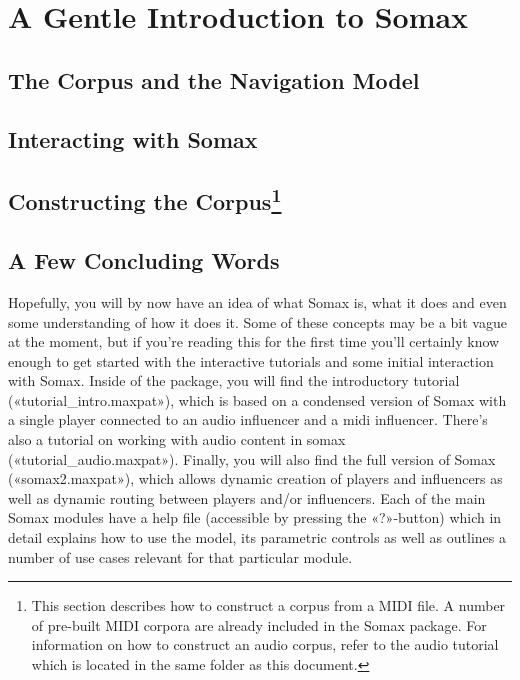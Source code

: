 \documentclass[11pt,a4paper]{report}
\begin{document}
\thispagestyle{empty}


\section*{A Gentle Introduction to Somax}




\subsection*{The Corpus and the Navigation Model}


\subsection*{Interacting with Somax}


\subsection*{Constructing the Corpus\footnote{This section describes how to construct a corpus from a MIDI file. A number of pre-built MIDI corpora are already included in the Somax package. For information on how to construct an audio corpus, refer to the audio tutorial which is located in the same folder as this document.}}



\subsection*{A Few Concluding Words}
Hopefully, you will by now have an idea of what Somax is, what it does and even some understanding of how it does it. Some of these concepts may be a bit vague at the moment, but if you're reading this for the first time you'll certainly know enough to get started with the interactive tutorials and some initial interaction with Somax. Inside of the package, you will find the introductory tutorial («tutorial\_intro.maxpat»), which is based on a condensed version of Somax with a single player connected to an audio influencer and a midi influencer. There's also a tutorial on working with audio content in somax («tutorial\_audio.maxpat»). Finally, you will also find the full version of Somax («somax2.maxpat»), which allows dynamic creation of players and influencers as well as dynamic routing between players and/or influencers. Each of the main Somax modules have a help file (accessible by pressing the «?»-button) which in detail explains how to use the model, its parametric controls as well as outlines a number of use cases relevant for that particular module. 
\end{document}
